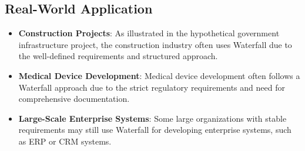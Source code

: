 \subsection{Real-World Application}

\begin{itemize}
  \item \textbf{Construction Projects}: As illustrated in the hypothetical government infrastructure project, the construction industry often uses Waterfall due to the well-defined requirements and structured approach.
  \item \textbf{Medical Device Development}: Medical device development often follows a Waterfall approach due to the strict regulatory requirements and need for comprehensive documentation.
  \item \textbf{Large-Scale Enterprise Systems}: Some large organizations with stable requirements may still use Waterfall for developing enterprise systems, such as ERP or CRM systems.
\end{itemize}





